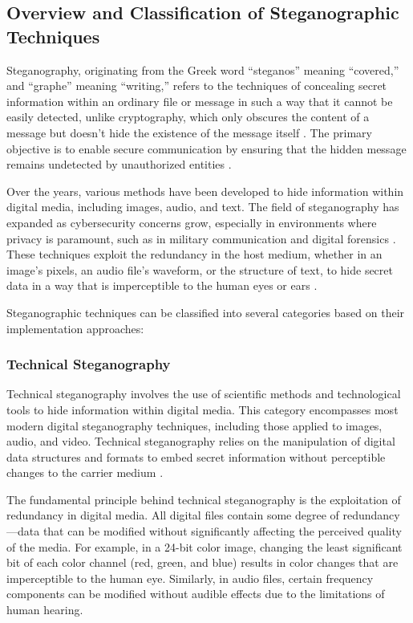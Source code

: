 \documentclass[12pt, a4paper, oneside]{book}
\begin{document}
\subsection{Overview and Classification of Steganographic Techniques}
Steganography, originating from the Greek word \enquote{steganos} meaning \enquote{covered,} and \enquote{graphe} meaning \enquote{writing,} refers to the techniques of concealing secret information within an ordinary file or message in such a way that it cannot be easily detected, unlike cryptography, which only obscures the content of a message but doesn't hide the existence of the message itself \cite{Research2021}. The primary objective is to enable secure communication by ensuring that the hidden message remains undetected by unauthorized entities \cite{JohnsonSmith2023}.

Over the years, various methods have been developed to hide information within digital media, including images, audio, and text. The field of steganography has expanded as cybersecurity concerns grow, especially in environments where privacy is paramount, such as in military communication and digital forensics \cite{Liu2023}. These techniques exploit the redundancy in the host medium, whether in an image's pixels, an audio file's waveform, or the structure of text, to hide secret data in a way that is imperceptible to the human eyes or ears \cite{Smith2022}.

Steganographic techniques can be classified into several categories based on their implementation approaches:

\subsubsection{Technical Steganography}
Technical steganography involves the use of scientific methods and technological tools to hide information within digital media. This category encompasses most modern digital steganography techniques, including those applied to images, audio, and video. Technical steganography relies on the manipulation of digital data structures and formats to embed secret information without perceptible changes to the carrier medium \cite{ZhangLiu2021}.

The fundamental principle behind technical steganography is the exploitation of redundancy in digital media. All digital files contain some degree of redundancy—data that can be modified without significantly affecting the perceived quality of the media. For example, in a 24-bit color image, changing the least significant bit of each color channel (red, green, and blue) results in color changes that are imperceptible to the human eye. Similarly, in audio files, certain frequency components can be modified without audible effects due to the limitations of human hearing.
\end{document}
